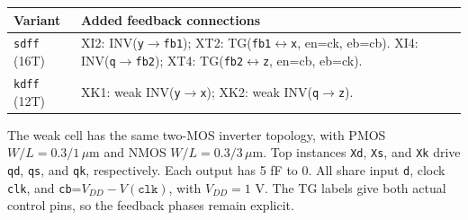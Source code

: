 \begin{center}\small\begin{tabular}{p{.24\linewidth}p{.68\linewidth}}\toprule
Variant & Added feedback connections\\\midrule
\texttt{sdff} (16T) & XI2: INV(\texttt{y}\(\to\)\texttt{fb1}); XT2: TG(\texttt{fb1}\(\leftrightarrow\)\texttt{x}, en=ck, eb=cb). XI4: INV(\texttt{q}\(\to\)\texttt{fb2}); XT4: TG(\texttt{fb2}\(\leftrightarrow\)\texttt{z}, en=cb, eb=ck).\\
\texttt{kdff} (12T) & XK1: weak INV(\texttt{y}\(\to\)\texttt{x}); XK2: weak INV(\texttt{q}\(\to\)\texttt{z}).\\
\bottomrule\end{tabular}\end{center}
The weak cell has the same two-MOS inverter topology, with PMOS \(W/L=0.3/1\,\mu\mathrm m\) and NMOS \(W/L=0.3/3\,\mu\mathrm m\).
Top instances \texttt{Xd}, \texttt{Xs}, and \texttt{Xk} drive \texttt{qd}, \texttt{qs}, and \texttt{qk}, respectively. Each output has 5 fF to 0. All share input \texttt{d}, clock \texttt{clk}, and \texttt{cb}=\(V_{DD}-V(\texttt{clk})\), with \(V_{DD}=1\) V. The TG labels give both actual control pins, so the feedback phases remain explicit.
\endgroup
